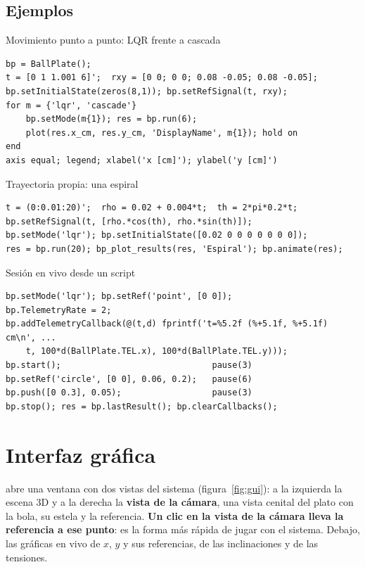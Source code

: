 \subsection{Ejemplos}

\begin{ejemplo}{Movimiento punto a punto: LQR frente a cascada}
\begin{lstlisting}
bp = BallPlate();
t = [0 1 1.001 6]';  rxy = [0 0; 0 0; 0.08 -0.05; 0.08 -0.05];
bp.setInitialState(zeros(8,1)); bp.setRefSignal(t, rxy);
for m = {'lqr', 'cascade'}
    bp.setMode(m{1}); res = bp.run(6);
    plot(res.x_cm, res.y_cm, 'DisplayName', m{1}); hold on
end
axis equal; legend; xlabel('x [cm]'); ylabel('y [cm]')
\end{lstlisting}
\end{ejemplo}

\begin{ejemplo}{Trayectoria propia: una espiral}
\begin{lstlisting}
t = (0:0.01:20)';  rho = 0.02 + 0.004*t;  th = 2*pi*0.2*t;
bp.setRefSignal(t, [rho.*cos(th), rho.*sin(th)]);
bp.setMode('lqr'); bp.setInitialState([0.02 0 0 0 0 0 0 0]);
res = bp.run(20); bp_plot_results(res, 'Espiral'); bp.animate(res);
\end{lstlisting}
\end{ejemplo}

\begin{ejemplo}{Sesión en vivo desde un script}
\begin{lstlisting}
bp.setMode('lqr'); bp.setRef('point', [0 0]);
bp.TelemetryRate = 2;
bp.addTelemetryCallback(@(t,d) fprintf('t=%5.2f (%+5.1f, %+5.1f) cm\n', ...
    t, 100*d(BallPlate.TEL.x), 100*d(BallPlate.TEL.y)));
bp.start();                              pause(3)
bp.setRef('circle', [0 0], 0.06, 0.2);   pause(6)
bp.push([0 0.3], 0.05);                  pause(3)
bp.stop(); res = bp.lastResult(); bp.clearCallbacks();
\end{lstlisting}
\end{ejemplo}

\section{Interfaz gráfica }

 abre una ventana con dos vistas del sistema (figura~\ref{fig:gui}): a la izquierda la escena 3D y a la derecha la \textbf{vista de la cámara}, una vista cenital del plato con la bola, su estela y la referencia. \textbf{Un clic en la vista de la cámara lleva la referencia a ese punto}: es la forma más rápida de jugar con el sistema. Debajo, las gráficas en vivo de $x$, $y$ y sus referencias, de las inclinaciones y de las tensiones.

